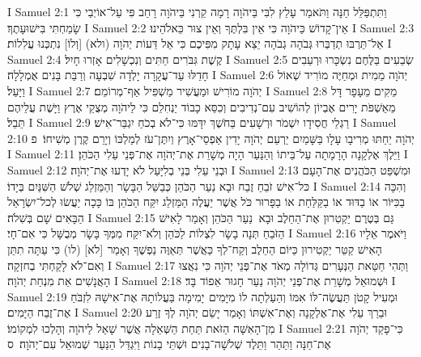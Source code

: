 I Samuel 2:1	וַתִּתְפַּלֵּל חַנָּה וַתֹּאמַר עָלַץ לִבִּי בַּיהֹוָה רָמָה קַרְנִי בַּיהֹוָה רָחַב פִּי עַל־אוֹיְבַי כִּי שָׂמַחְתִּי בִּישׁוּעָתֶךָ׃
I Samuel 2:2	אֵין־קָדוֹשׁ כַּיהֹוָה כִּי אֵין בִּלְתֶּךָ וְאֵין צוּר כֵּאלֹהֵינוּ׃
I Samuel 2:3	אַל־תַּרְבּוּ תְדַבְּרוּ גְּבֹהָה גְבֹהָה יֵצֵא עָתָק מִפִּיכֶם כִּי אֵל דֵּעוֹת יְהֹוָה (ולא) [וְלוֹ] נִתְכְּנוּ עֲלִלוֹת׃
I Samuel 2:4	קֶשֶׁת גִּבֹּרִים חַתִּים וְנִכְשָׁלִים אָזְרוּ חָיִל׃
I Samuel 2:5	שְׂבֵעִים בַּלֶּחֶם נִשְׂכָּרוּ וּרְעֵבִים חָדֵלּוּ עַד־עֲקָרָה יָלְדָה שִׁבְעָה וְרַבַּת בָּנִים אֻמְלָלָה׃
I Samuel 2:6	יְהֹוָה מֵמִית וּמְחַיֶּה מוֹרִיד שְׁאוֹל וַיָּעַל׃
I Samuel 2:7	יְהֹוָה מוֹרִישׁ וּמַעֲשִׁיר מַשְׁפִּיל אַף־מְרוֹמֵם׃
I Samuel 2:8	מֵקִים מֵעָפָר דָּל מֵאַשְׁפֹּת יָרִים אֶבְיוֹן לְהוֹשִׁיב עִם־נְדִיבִים וְכִסֵּא כָבוֹד יַנְחִלֵם כִּי לַיהֹוָה מְצֻקֵי אֶרֶץ וַיָּשֶׁת עֲלֵיהֶם תֵּבֵל׃
I Samuel 2:9	רַגְלֵי חֲסִידָו יִשְׁמֹר וּרְשָׁעִים בַּחֹשֶׁךְ יִדָּמּוּ כִּי־לֹא בְכֹחַ יִגְבַּר־אִישׁ׃
I Samuel 2:10	יְהֹוָה יֵחַתּוּ מְרִיבָו עָלָו בַּשָּׁמַיִם יַרְעֵם יְהֹוָה יָדִין אַפְסֵי־אָרֶץ וְיִתֶּן־עֹז לְמַלְכּוֹ וְיָרֵם קֶרֶן מְשִׁיחוֹ׃ {פ}
I Samuel 2:11	וַיֵּלֶךְ אֶלְקָנָה הָרָמָתָה עַל־בֵּיתוֹ וְהַנַּעַר הָיָה מְשָׁרֵת אֶת־יְהֹוָה אֶת־פְּנֵי עֵלִי הַכֹּהֵן׃
I Samuel 2:12	וּבְנֵי עֵלִי בְּנֵי בְלִיָּעַל לֹא יָדְעוּ אֶת־יְהֹוָה׃
I Samuel 2:13	וּמִשְׁפַּט הַכֹּהֲנִים אֶת־הָעָם כּל־אִישׁ זֹבֵחַ זֶבַח וּבָא נַעַר הַכֹּהֵן כְּבַשֵּׁל הַבָּשָׂר וְהַמַּזְלֵג שְׁלֹשׁ הַשִּׁנַּיִם בְּיָדוֹ׃
I Samuel 2:14	וְהִכָּה בַכִּיּוֹר אוֹ בַדּוּד אוֹ בַקַּלַּחַת אוֹ בַפָּרוּר כֹּל אֲשֶׁר יַעֲלֶה הַמַּזְלֵג יִקַּח הַכֹּהֵן בּוֹ כָּכָה יַעֲשׂוּ לְכל־יִשְׂרָאֵל הַבָּאִים שָׁם בְּשִׁלֹה׃
I Samuel 2:15	גַּם בְּטֶרֶם יַקְטִרוּן אֶת־הַחֵלֶב וּבָא  נַעַר הַכֹּהֵן וְאָמַר לָאִישׁ הַזֹּבֵחַ תְּנָה בָשָׂר לִצְלוֹת לַכֹּהֵן וְלֹא־יִקַּח מִמְּךָ בָּשָׂר מְבֻשָּׁל כִּי אִם־חָי׃
I Samuel 2:16	וַיֹּאמֶר אֵלָיו הָאִישׁ קַטֵּר יַקְטִירוּן כַּיּוֹם הַחֵלֶב וְקַח־לְךָ כַּאֲשֶׁר תְּאַוֶּה נַפְשֶׁךָ וְאָמַר  [לֹא] (לו) כִּי עַתָּה תִתֵּן וְאִם־לֹא לָקַחְתִּי בְחזְקָה׃
I Samuel 2:17	וַתְּהִי חַטַּאת הַנְּעָרִים גְּדוֹלָה מְאֹד אֶת־פְּנֵי יְהֹוָה כִּי נִאֲצוּ הָאֲנָשִׁים אֵת מִנְחַת יְהֹוָה׃
I Samuel 2:18	וּשְׁמוּאֵל מְשָׁרֵת אֶת־פְּנֵי יְהֹוָה נַעַר חָגוּר אֵפוֹד בָּד׃
I Samuel 2:19	וּמְעִיל קָטֹן תַּעֲשֶׂה־לּוֹ אִמּוֹ וְהַעַלְתָה לוֹ מִיָּמִים  יָמִימָה בַּעֲלוֹתָהּ אֶת־אִישָׁהּ לִזְבֹּחַ אֶת־זֶבַח הַיָּמִים׃
I Samuel 2:20	וּבֵרַךְ עֵלִי אֶת־אֶלְקָנָה וְאֶת־אִשְׁתּוֹ וְאָמַר יָשֵׂם יְהֹוָה לְךָ זֶרַע מִן־הָאִשָּׁה הַזֹּאת תַּחַת הַשְּׁאֵלָה אֲשֶׁר שָׁאַל לַיהֹוָה וְהָלְכוּ לִמְקוֹמוֹ׃
I Samuel 2:21	כִּי־פָקַד יְהֹוָה אֶת־חַנָּה וַתַּהַר וַתֵּלֶד שְׁלֹשָׁה־בָנִים וּשְׁתֵּי בָנוֹת וַיִּגְדַּל הַנַּעַר שְׁמוּאֵל עִם־יְהֹוָה׃ {ס}        
